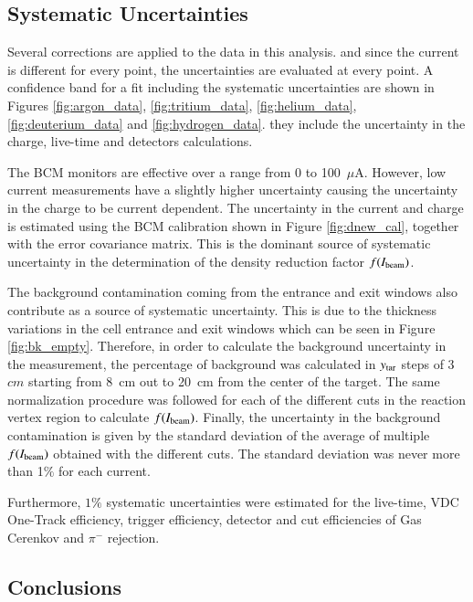 \documentclass[final,5p,times,twocolumn]{elsarticle}
\begin{document}
\subsection{Systematic Uncertainties}

Several corrections are applied to the data in this analysis. and since the current is different for every point, the uncertainties are evaluated at every point.  A confidence band for a fit including the systematic uncertainties are shown in Figures  \ref{fig:argon_data}, \ref{fig:tritium_data}, \ref{fig:helium_data}, \ref{fig:deuterium_data} and \ref{fig:hydrogen_data}. they include the uncertainty in the charge, live-time and detectors calculations.

The BCM monitors are effective over a range from 0 to 100~$\mu$A. However, low current measurements have a slightly higher 
uncertainty causing the uncertainty in the charge to be current dependent. The uncertainty in the current and charge is estimated 
using the BCM calibration shown in Figure \ref{fig:dnew_cal}, together with the error covariance matrix.
This is the dominant source of systematic uncertainty in the determination of the density reduction factor $f(I_{\rm{beam}})$.

The background contamination coming from the entrance and exit windows also contribute as a source of systematic uncertainty. This is due to the thickness variations in the cell entrance and exit windows which can be seen in Figure \ref{fig:bk_empty}. Therefore, in order to calculate the background uncertainty in the measurement, the percentage of background was calculated in $y_{\rm{tar}}$ steps of $3$ $cm$ starting from 8~cm out to 20~cm from the center of the target.  The same normalization procedure was followed for each of the different cuts in the reaction vertex region to calculate $f(I_{\rm{beam}})$. Finally, the uncertainty in the background contamination is given by the standard deviation of the average of multiple $f(I_{\rm{beam}})$ obtained with the different cuts. The standard deviation was never more than 1$\%$ for each current.

Furthermore, $1\%$ systematic uncertainties were estimated for the live-time, VDC One-Track efficiency, 
trigger efficiency, detector and cut efficiencies of Gas Cerenkov and $\pi^{-}$ rejection.

\subsection {Conclusions }
\end{document}
